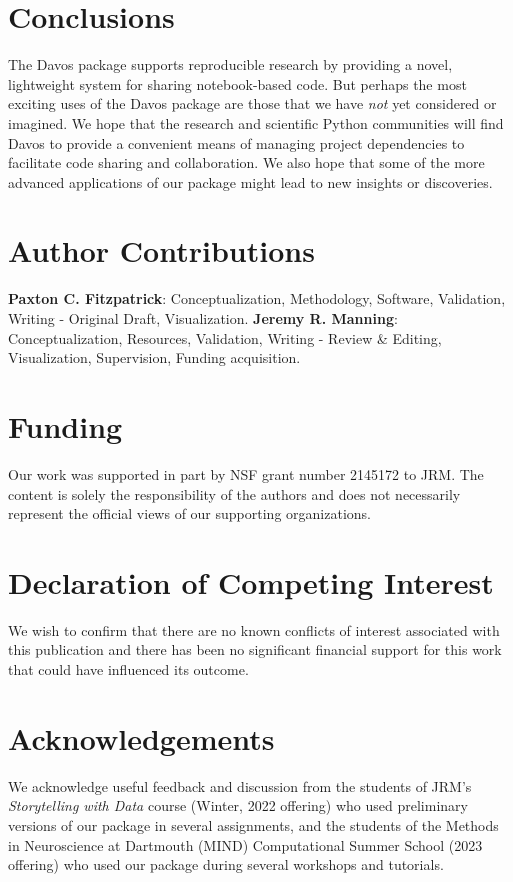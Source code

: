 \documentclass[preprint,12pt,a4paper]{elsarticle}
\begin{document}
\section{Conclusions}

The Davos package supports reproducible research by providing
a novel, lightweight system for sharing notebook-based code. But
perhaps the most exciting uses of the Davos package are those
that we have \textit{not} yet considered or imagined. We hope that the
research and scientific Python communities will find Davos to provide a convenient
means of managing project dependencies to facilitate code sharing and collaboration. We
also hope that some of the more advanced applications of our package
might lead to new insights or discoveries.


\section*{Author Contributions}

\textbf{Paxton C. Fitzpatrick}: Conceptualization, Methodology,
Software, Validation, Writing - Original Draft,
Visualization. \textbf{Jeremy R. Manning}: Conceptualization,
Resources, Validation, Writing - Review \& Editing, Visualization, Supervision,
Funding acquisition.

\section*{Funding}

Our work was supported in part by NSF grant number 2145172 to JRM.
The content is solely the responsibility of the authors and does not
necessarily represent the official views of our supporting
organizations.


\section*{Declaration of Competing Interest}

We wish to confirm that there are no known conflicts of interest
associated with this publication and there has been no significant
financial support for this work that could have influenced its
outcome.


\section*{Acknowledgements}

We acknowledge useful feedback and discussion from the students of
JRM's \textit{Storytelling with Data} course (Winter, 2022 offering)
who used preliminary versions of our package in several assignments,
and the students of the Methods in Neuroscience at Dartmouth (MIND)
Computational Summer School (2023 offering) who used our package
during several workshops and tutorials.




\end{document}
